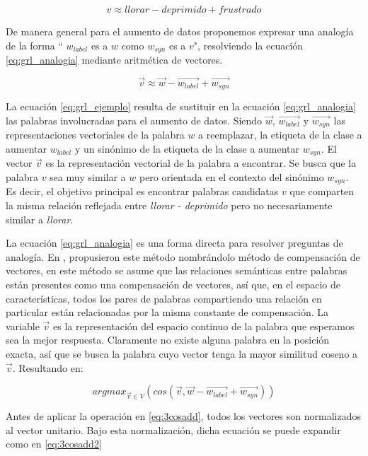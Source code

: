  \begin{equation}
    \label{eq:grl_ejemplo}
     v \approx  llorar-deprimido+frustrado
 \end{equation}


De manera general para el aumento de datos proponemos expresar una analogía de la forma `` $w_{label}$ es a $w$ como $w_{syn}$ es a $v$", resolviendo la ecuación \ref{eq:grl_analogia} mediante aritmética de vectores.

 \begin{equation}
    \label{eq:grl_analogia}
    \vec{v} \approx \vec{w}-\vec{w_{label}}+\vec{w_{syn}}
\end{equation}
 
La ecuación \ref{eq:grl_ejemplo} resulta de sustituir en la ecuación \ref{eq:grl_analogia} las palabras involucradas para el aumento de datos. 
Siendo $\vec{w}$, $\vec{w_{label}}$  y $\vec{w_{syn}}$ las representaciones vectoriales de la palabra $w$ a reemplazar, la etiqueta de la clase a aumentar $w_{label}$ y un sinónimo de la etiqueta de la clase a aumentar $w_{syn}$. El vector $\vec{v}$ es la representación vectorial de la palabra a encontrar. Se busca que la palabra $v$ sea muy similar a $w$ pero orientada en el contexto del sinónimo $w_{syn}$. Es decir, el objetivo principal es encontrar palabras candidatas $v$ que comparten la misma relación reflejada entre \textit{llorar - deprimido} pero no necesariamente similar a \textit{llorar}.

 La ecuación \ref{eq:grl_analogia} es una forma directa para resolver preguntas de analogía. En \citep{mikolov2013linguistic}, propusieron este método nombrándolo método de compensación de vectores, en este método se asume que las relaciones semánticas entre palabras están presentes como una compensación de vectores, así que, en el espacio de características, todos los pares de palabras compartiendo una relación en particular están relacionadas por la misma constante de compensación. La variable $\vec{v}$ es la representación del espacio continuo de la palabra que esperamos sea la mejor respuesta. Claramente no existe alguna palabra en la posición exacta, así que se busca la palabra cuyo vector tenga la mayor similitud coseno a $\vec{v}$. Resultando en:

\begin{equation}
\label{eq:3cosadd}
    arg max_{\vec{v}\in V}( cos (\vec{v}, \vec{w}-\vec{w_{label}}+\vec{w_{syn}}))
\end{equation}

Antes de aplicar la operación en \ref{eq:3cosadd}, todos los vectores son normalizados al vector unitario. Bajo esta normalización, dicha ecuación se puede expandir como en \ref{eq:3cosadd2}

